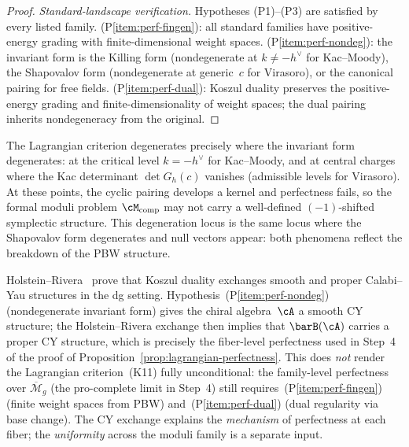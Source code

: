\begin{proof}
\smallskip\noindent
\emph{Standard-landscape verification.}
Hypotheses (P1)--(P3) are satisfied by every listed family.
(P\ref{item:perf-fingen}): all standard families have
positive-energy grading with finite-dimensional weight spaces.
(P\ref{item:perf-nondeg}): the invariant form is the Killing
form (nondegenerate at $k \neq -h^\vee$ for Kac--Moody), the
Shapovalov form (nondegenerate at generic~$c$ for Virasoro),
or the canonical pairing for free fields.
(P\ref{item:perf-dual}): Koszul duality preserves the positive-energy
grading and finite-dimensionality of weight spaces; the dual
pairing inherits nondegeneracy from the original.
\end{proof}

\begin{remark}
\label{rem:lagrangian-degeneration-locus}
The Lagrangian criterion degenerates precisely where the invariant
form degenerates: at the critical level $k = -h^\vee$ for
Kac--Moody, and at central charges where the Kac determinant
$\det G_h(c)$ vanishes (admissible levels for Virasoro).
At these points, the cyclic pairing develops a kernel and
perfectness fails, so the formal moduli problem
$\cM_{\mathrm{comp}}$ may not carry a well-defined
$(-1)$-shifted symplectic structure. This degeneration locus
is the same locus where the Shapovalov form degenerates
and null vectors appear: both phenomena reflect the
breakdown of the PBW structure.
\end{remark}

\begin{remark}
\label{rem:cy-interpretation-perfectness}
Holstein--Rivera~\cite{HR24} prove that Koszul duality exchanges
smooth and proper Calabi--Yau structures in the dg setting.
Hypothesis~(P\ref{item:perf-nondeg}) (nondegenerate invariant form)
gives the chiral algebra~$\cA$ a smooth CY structure; the
Holstein--Rivera exchange then implies that $\barB(\cA)$ carries a
proper CY structure, which is precisely the fiber-level perfectness
used in Step~4 of the proof of
Proposition~\ref{prop:lagrangian-perfectness}.
This does \emph{not} render the Lagrangian criterion~(K11) fully
unconditional: the family-level perfectness over
$\overline{\mathcal{M}}_g$ (the pro-complete limit in Step~4)
still requires~(P\ref{item:perf-fingen}) (finite weight spaces from
PBW) and~(P\ref{item:perf-dual}) (dual regularity via base change).
The CY exchange explains the \emph{mechanism} of perfectness at
each fiber; the \emph{uniformity} across the moduli family is a
separate input.
\end{remark}

